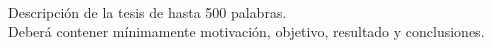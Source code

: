 \ \\
\ \\
\label{pagresum}
\\
\ \\
\ \\

\ \\

\ \\
\ \\
Descripción de la tesis de hasta 500 palabras.\\

 Deberá contener mínimamente motivación,  objetivo, resultado y conclusiones. 

\vfill
\pagebreak
